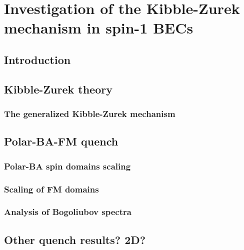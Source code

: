 \chapter{Investigation of the Kibble-Zurek mechanism in spin-1 BECs}

\section{Introduction}

\section{Kibble-Zurek theory}
\subsection{The generalized Kibble-Zurek mechanism}

\section{Polar-BA-FM quench}
\subsection{Polar-BA spin domains scaling}
\subsection{Scaling of FM domains}
\subsection{Analysis of Bogoliubov spectra}

\section{Other quench results? 2D?}
